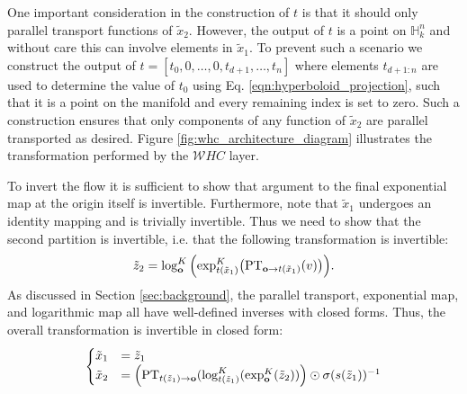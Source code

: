 One important consideration in the construction of $t$ is that it should only parallel transport functions of $\tilde{x}_2$. However, the output of $t$ is a point on $\mathbb{H}^n_k$ and without care this can involve elements in $\tilde{x}_1$. To prevent such a scenario we construct the output of $t = [t_0, 0, \dots , 0, t_{d+1}, \dots , t_{n}]$ where elements $t_{d+1:n}$ are used to determine the value of $t_0$ using Eq. \ref{eqn:hyperboloid_projection}, such that it is a point on the manifold and every remaining index is set to zero. Such a construction ensures that only components of any function of $\tilde{x}_2$ are parallel transported as desired. Figure \ref{fig:whc_architecture_diagram} illustrates the transformation performed by the $\mathcal{W}HC$ layer.

To invert the flow it is sufficient to show that argument to the final exponential map at the origin itself is invertible. Furthermore, note that $\tilde{x}_1$ undergoes an identity mapping and is trivially invertible. Thus we need to show that the second partition is invertible, i.e. that the following transformation is invertible:
\begin{equation}
     \tilde{z}_{2} = \log_{\textbf{o}}^K\Big( \textnormal{exp}_{t(\tilde{x}_{1})}^K\big(\textnormal{PT}_{\textbf{o}\to t(\tilde{x}_{1}) }(v)\big)\Big).
\end{equation}
As discussed in Section \ref{sec:background}, the parallel transport, exponential map, and logarithmic map all have well-defined inverses with closed forms. Thus, the overall transformation is invertible in closed form:
\begin{align*}
     \begin{cases}
     \tilde{x}_{1} &= \tilde{z}_{1} \\
     \tilde{x}_{2} &= \Big( \textnormal{PT}_{t(\tilde{z}_{1}) \to \textbf{o} }(\log_{t(\tilde{z}_{1})}^K( \textnormal{exp}_{\textbf{o}}^K(\tilde{z}_{2}))\Big) \odot \sigma(s(\tilde{z}_{1}))^{-1} \\
    \end{cases}
\end{align*}


